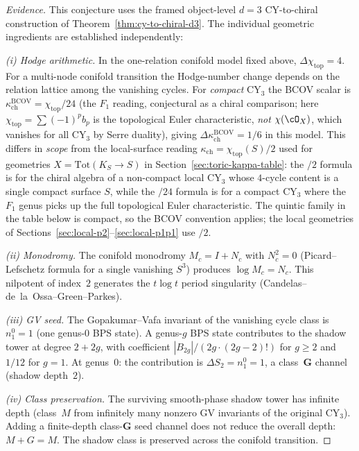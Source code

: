 \begin{proof}[Evidence]
This conjecture uses the framed object-level \(d=3\) CY-to-chiral
construction of Theorem~\ref{thm:cy-to-chiral-d3}. The individual
geometric ingredients are established independently:

\smallskip
\noindent\textit{(i) Hodge arithmetic.} In the one-relation conifold model fixed above, \(\Delta\chi_{\mathrm{top}}=4\). For a multi-node conifold transition the Hodge-number change depends on the relation lattice among the vanishing cycles. For \emph{compact} CY$_3$ the BCOV scalar is $\kappa_{\mathrm{ch}}^{\mathrm{BCOV}}=\chi_{\mathrm{top}}/24$ (the $F_1$ reading, conjectural as a chiral comparison; here $\chi_{\mathrm{top}} = \sum (-1)^p b_p$ is the topological Euler characteristic, \emph{not} $\chi(\cO_X)$, which vanishes for all CY$_3$ by Serre duality), giving \(\Delta \kappa_{\mathrm{ch}}^{\mathrm{BCOV}}=1/6\) in this model. This differs in \emph{scope} from the local-surface reading $\kappa_{\mathrm{ch}} = \chi_{\mathrm{top}}(S)/2$ used for geometries $X = \mathrm{Tot}(K_S \to S)$ in Section~\ref{sec:toric-kappa-table}: the $/2$ formula is for the chiral algebra of a non-compact local CY$_3$ whose $4$-cycle content is a single compact surface $S$, while the $/24$ formula is for a compact CY$_3$ where the $F_1$ genus picks up the full topological Euler characteristic. The quintic family in the table below is compact, so the BCOV convention applies; the local geometries of Sections~\ref{sec:local-p2}--\ref{sec:local-p1p1} use $/2$.

\smallskip
\noindent\textit{(ii) Monodromy.} The conifold monodromy $M_c = I + N_c$ with $N_c^2 = 0$ (Picard--Lefschetz formula for a single vanishing $S^3$) produces $\log M_c = N_c$. This nilpotent of index~$2$ generates the $t \log t$ period singularity (Candelas--de~la~Ossa--Green--Parkes).

\smallskip
\noindent\textit{(iii) GV seed.} The Gopakumar--Vafa invariant of the vanishing cycle class is $n^0_1 = 1$ (one genus-$0$ BPS state). A genus-$g$ BPS state contributes to the shadow tower at degree $2 + 2g$, with coefficient $|B_{2g}|/(2g \cdot (2g-2)!)$ for $g \geq 2$ and $1/12$ for $g = 1$. At genus~$0$: the contribution is $\Delta S_2 = n^0_1 = 1$, a class~$\mathbf{G}$ channel (shadow depth~$2$).

\smallskip
\noindent\textit{(iv) Class preservation.} The surviving smooth-phase shadow tower has infinite depth (class~$M$ from infinitely many nonzero GV invariants of the original CY$_3$). Adding a finite-depth class-$\mathbf{G}$ seed channel does not reduce the overall depth: $M + G = M$. The shadow class is preserved across the conifold transition.
\end{proof}

